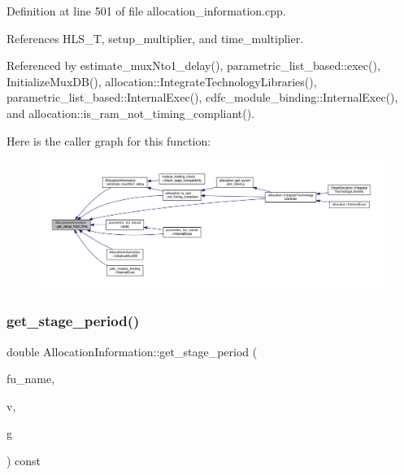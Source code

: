 Definition at line 501 of file allocation\+\_\+information.\+cpp.



References H\+L\+S\+\_\+T, setup\+\_\+multiplier, and time\+\_\+multiplier.



Referenced by estimate\+\_\+mux\+Nto1\+\_\+delay(), parametric\+\_\+list\+\_\+based\+::exec(), Initialize\+Mux\+D\+B(), allocation\+::\+Integrate\+Technology\+Libraries(), parametric\+\_\+list\+\_\+based\+::\+Internal\+Exec(), cdfc\+\_\+module\+\_\+binding\+::\+Internal\+Exec(), and allocation\+::is\+\_\+ram\+\_\+not\+\_\+timing\+\_\+compliant().

Here is the caller graph for this function\+:
\nopagebreak
\begin{figure}[H]
\begin{center}
\leavevmode
\includegraphics[width=350pt]{d7/d79/classAllocationInformation_a29ab49e3d2401690bd30b11de24294cb_icgraph}
\end{center}
\end{figure}
\mbox{\label{classAllocationInformation_ac3fa28933b3a4221c71f233f444479d4}} 
\subsubsection{\texorpdfstring{get\+\_\+stage\+\_\+period()}{get\_stage\_period()}\hspace{0.1cm}{\footnotesize\ttfamily [1/2]}}
{\footnotesize\ttfamily double Allocation\+Information\+::get\+\_\+stage\+\_\+period (\begin{DoxyParamCaption}\item[{const unsigned int}]{fu\+\_\+name,  }\item[{const \hyperlink{graph_8hpp_abefdcf0544e601805af44eca032cca14}{vertex}}]{v,  }\item[{const \hyperlink{op__graph_8hpp_a9a0b240622c47584bee6951a6f5de746}{Op\+Graph\+Const\+Ref}}]{g }\end{DoxyParamCaption}) const}




